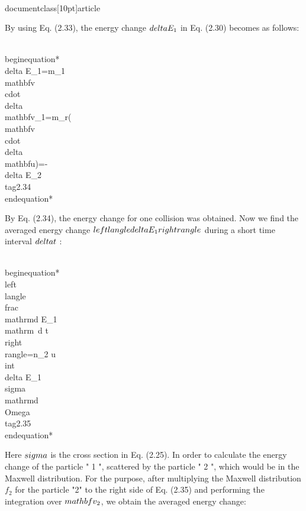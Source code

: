 \\documentclass[10pt]{article}
\begin{document}
By using Eq. (2.33), the energy change $\\delta E_{1}$ in Eq. (2.30) becomes as follows:


\\begin{equation*}
\\delta E_{1}=m_{1} \\mathbf{v} \\cdot \\delta \\mathbf{v}_{1}=m_{r}(\\mathbf{v} \\cdot \\delta \\mathbf{u})=-\\delta E_{2} \\tag{2.34}
\\end{equation*}


By Eq. (2.34), the energy change for one collision was obtained. Now we find the averaged energy change $\\left\\langle\\delta E_{1}\\right\\rangle$ during a short time interval $\\delta t$ :


\\begin{equation*}
\\left\\langle\\frac{\\mathrm{d} E_{1}}{\\mathrm{~d} t}\\right\\rangle=n_{2} u \\int \\delta E_{1} \\sigma \\mathrm{d} \\Omega \\tag{2.35}
\\end{equation*}


Here $\\sigma$ is the cross section in Eq. (2.25). In order to calculate the energy change of the particle " 1 ", scattered by the particle " 2 ", which would be in the Maxwell distribution. For the purpose, after multiplying the Maxwell distribution $f_{2}$ for the particle "2" to the right side of Eq. (2.35) and performing the integration over $\\mathbf{v}_{2}$, we obtain the averaged energy change:
\end{document}
